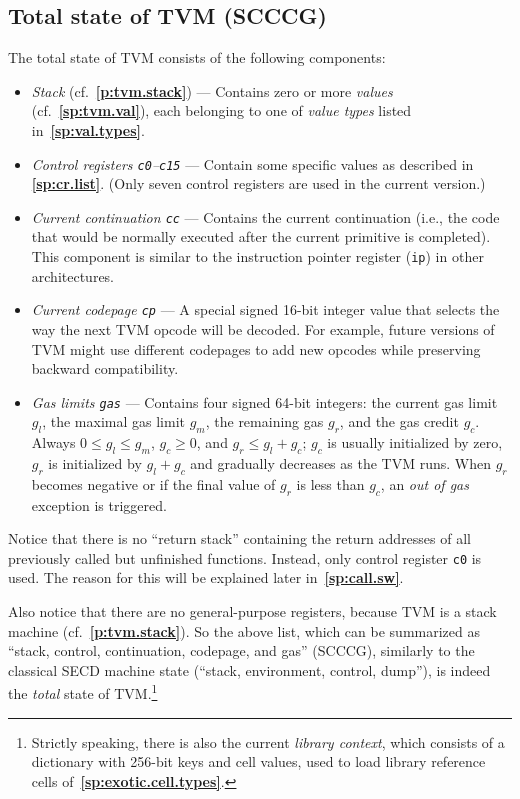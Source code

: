 \documentclass[12pt,oneside]{article}
\def\refpoint#1{{\rm\textbf{\ref{#1}}}}
\let\ptref=\refpoint
\def\mysubsection#1{

    \subsection{#1}\fancyhead[C]{\small{\textsc{\textrm{\thesubsection.} #1}}}}
\begin{document}
    \mysubsection{Total state of TVM (SCCCG)}\label{p:tvm.state}
    The total state of TVM consists of the following components:
    \begin{itemize}
        \item {\em Stack} (cf.~\ptref{p:tvm.stack}) --- Contains zero or more {\em values\/} (cf.~\ptref{sp:tvm.val}), each belonging to one of {\em value types} listed in~\ptref{sp:val.types}.
        \item {\em Control registers \texttt{c0}--\texttt{c15}} --- Contain some specific values as described in \ptref{sp:cr.list}. (Only seven control registers are used in the current version.)
        \item {\em Current continuation \texttt{cc}} --- Contains the current continuation (i.e., the code that would be normally executed after the current primitive is completed). This component is similar to the instruction pointer register (\texttt{ip}) in other architectures.
        \item {\em Current codepage \texttt{cp}} --- A special signed 16-bit integer value that selects the way the next TVM opcode will be decoded. For example, future versions of TVM might use different codepages to add new opcodes while preserving backward compatibility.
        \item {\em Gas limits \texttt{gas}} --- Contains four signed 64-bit integers: the current gas limit $g_l$, the maximal gas limit $g_m$, the remaining gas $g_r$, and the gas credit $g_c$. Always $0\leq g_l\leq g_m$, $g_c\geq0$, and $g_r\leq g_l+g_c$; $g_c$ is usually initialized by zero, $g_r$ is initialized by $g_l+g_c$ and gradually decreases as the TVM runs. When $g_r$ becomes negative or if the final value of $g_r$ is less than $g_c$, an {\em out of gas\/} exception is triggered.
    \end{itemize}
    Notice that there is no ``return stack'' containing the return addresses of all previously called but unfinished functions. Instead, only control register \texttt{c0} is used. The reason for this will be explained later in~\ptref{sp:call.sw}.

    Also notice that there are no general-purpose registers, because TVM is a stack machine (cf.~\ptref{p:tvm.stack}). So the above list, which can be summarized as ``stack, control, continuation, codepage, and gas'' (SCCCG), similarly to the classical SECD machine state (``stack, environment, control, dump''), is indeed the {\em total\/} state of TVM.\footnote{Strictly speaking, there is also the current {\em library context}, which consists of a dictionary with 256-bit keys and cell values, used to load library reference cells of~\ptref{sp:exotic.cell.types}.}
\end{document}
